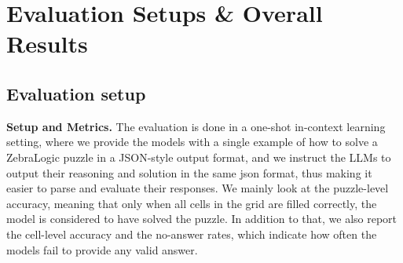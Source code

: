 \section{Evaluation Setups \& Overall Results}
\label{sec:evaluation}





 

\subsection{Evaluation setup}




\textbf{Setup and Metrics.} The evaluation is done in a one-shot in-context learning setting, where we provide the models with a single example of how to solve a ZebraLogic puzzle in a JSON-style output format, and we instruct the LLMs to output their reasoning and solution in the same json format, thus making it easier to parse and evaluate their responses.
We mainly look at the puzzle-level accuracy, meaning that only when all cells in the grid are filled correctly, the model is considered to have solved the puzzle. In addition to that, we also report the cell-level accuracy and the no-answer rates, which indicate how often the models fail to provide any valid answer.




